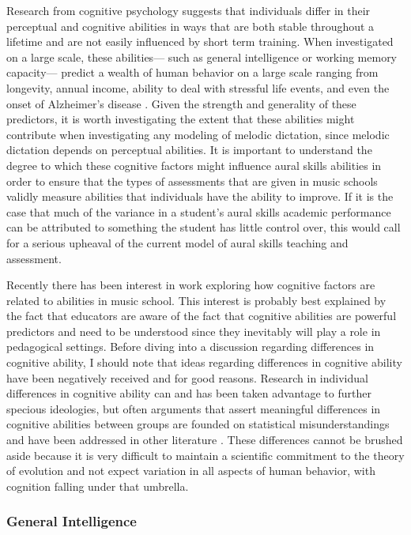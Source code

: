 \documentclass[12pt,]{book}
\begin{document}
Research from cognitive psychology suggests that individuals differ in their perceptual and cognitive abilities in ways that are both stable throughout a lifetime and are not easily influenced by short term training.
When investigated on a large scale, these abilities--- such as general intelligence or working memory capacity--- predict a wealth of human behavior on a large scale ranging from longevity, annual income, ability to deal with stressful life events, and even the onset of Alzheimer's disease \citep{ritchieIntelligenceAllThat2015, unsworthAutomatedVersionOperation2005}.
Given the strength and generality of these predictors, it is worth investigating the extent that these abilities might contribute when investigating any modeling of melodic dictation, since melodic dictation depends on perceptual abilities.
It is important to understand the degree to which these cognitive factors might influence aural skills abilities in order to ensure that the types of assessments that are given in music schools validly measure abilities that individuals have the ability to improve.
If it is the case that much of the variance in a student's aural skills academic performance can be attributed to something the student has little control over, this would call for a serious upheaval of the current model of aural skills teaching and assessment.

Recently there has been interest in work exploring how cognitive factors are related to abilities in music school.
This interest is probably best explained by the fact that educators are aware of the fact that cognitive abilities are powerful predictors and need to be understood since they inevitably will play a role in pedagogical settings.
Before diving into a discussion regarding differences in cognitive ability, I should note that ideas regarding differences in cognitive ability have been negatively received and for good reasons.
Research in individual differences in cognitive ability can and has been taken advantage to further specious ideologies, but often arguments that assert meaningful differences in cognitive abilities between groups are founded on statistical misunderstandings and have been addressed in other literature \citep{gouldMismeasureMan1996}.
These differences cannot be brushed aside because it is very difficult to maintain a scientific commitment to the theory of evolution \citep{darwinOriginSpecies1859} and not expect variation in all aspects of human behavior, with cognition falling under that umbrella.

\hypertarget{general-intelligence}{%
\subsubsection{General Intelligence}\label{general-intelligence}}
\end{document}

